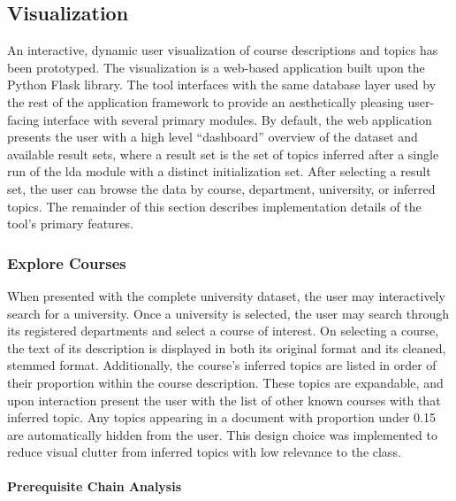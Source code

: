 \subsection{Visualization}
\label{sec:visualization}


An interactive, dynamic user visualization of course descriptions and topics has been prototyped.
The visualization is a web-based application built upon the Python Flask library.
The tool interfaces with the same database layer used by the rest of the application framework to provide an aesthetically pleasing user-facing interface with several primary modules.
By default, the web application presents the user with a high level ``dashboard'' overview of the dataset and available result sets, where a result set is the set of topics inferred after a single run of the \ac{lda} module with a distinct initialization set.
After selecting a result set, the user can browse the data by course, department, university, or inferred topics.
The remainder of this section describes implementation details of the tool's primary features.


\subsubsection{Explore Courses}
\label{sec:vis-course}


When presented with the complete university dataset, the user may interactively search for a university.
Once a university is selected, the user may search through its registered departments and select a course of interest.
On selecting a course, the text of its description is displayed in both its original format and its cleaned, stemmed format.
Additionally, the course's inferred topics are listed in order of their proportion within the course description.
These topics are expandable, and upon interaction present the user with the list of other known courses with that inferred topic.
Any topics appearing in a document with proportion under 0.15 are automatically hidden from the user.
This design choice was implemented to reduce visual clutter from inferred topics with low relevance to the class.


\paragraph{Prerequisite Chain Analysis}
\label{sec:vis-prerequisites}

